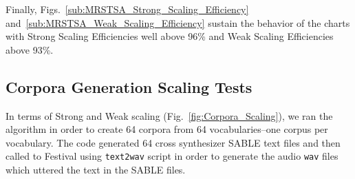 \documentclass[10pt,journal,compsoc]{IEEEtran}
\begin{document}
Finally, Figs.~\ref{sub:MRSTSA_Strong_Scaling_Efficiency} and~\ref{sub:MRSTSA_Weak_Scaling_Efficiency} sustain the behavior of the charts with Strong Scaling Efficiencies well above 96\% and Weak Scaling Efficiencies above 93\%.



















\subsection{Corpora Generation Scaling Tests}

In terms of Strong and Weak scaling (Fig.~\ref{fig:Corpora_Scaling}), we ran the algorithm in order to create 64 corpora from 64 vocabularies--one corpus per vocabulary. The code generated 64 cross synthesizer SABLE text files and then called to Festival using \texttt{text2wav} script in order to generate the audio \texttt{wav} files which uttered the text in the SABLE files.
\end{document}
